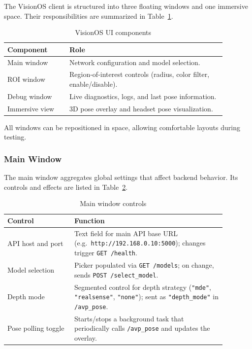 The VisionOS client is structured into three floating windows and one immersive space. Their responsibilities are summarized in Table~\ref{tab:avp-ui-components-dev}.

\begin{table}[H]
    \centering
    \caption{VisionOS UI components}
    \label{tab:avp-ui-components-dev}
    \begin{tabular}{p{0.25\linewidth}p{0.63\linewidth}}
        \toprule
        \textbf{Component} & \textbf{Role} \\
        \midrule
        Main window &
        Network configuration and model selection. \\
        ROI window &
        Region-of-interest controls (radius, color filter, enable/disable). \\
        Debug window &
        Live diagnostics, logs, and last pose information. \\
        Immersive view &
        3D pose overlay and headset pose visualization. \\
        \bottomrule
    \end{tabular}
\end{table}

All windows can be repositioned in space, allowing comfortable layouts during testing.

\subsubsection{Main Window}

The main window aggregates global settings that affect backend behavior. Its controls and effects are listed in Table~\ref{tab:main-window-controls}.

\begin{table}[H]
    \centering
    \caption{Main window controls}
    \label{tab:main-window-controls}
    \begin{tabular}{p{0.27\linewidth}p{0.61\linewidth}}
        \toprule
        \textbf{Control} & \textbf{Function} \\
        \midrule
        API host and port &
        Text field for main API base URL (e.g.\ \texttt{http://192.168.0.10:5000}); changes trigger \texttt{GET /health}. \\
        Model selection &
        Picker populated via \texttt{GET /models}; on change, sends \texttt{POST /select\_model}. \\
        Depth mode &
        Segmented control for depth strategy (\texttt{"mde"}, \texttt{"realsense"}, \texttt{"none"}); sent as \texttt{"depth\_mode"} in \texttt{/avp\_pose}. \\
        Pose polling toggle &
        Starts/stops a background task that periodically calls \texttt{/avp\_pose} and updates the overlay. \\
        \bottomrule
    \end{tabular}
\end{table}

